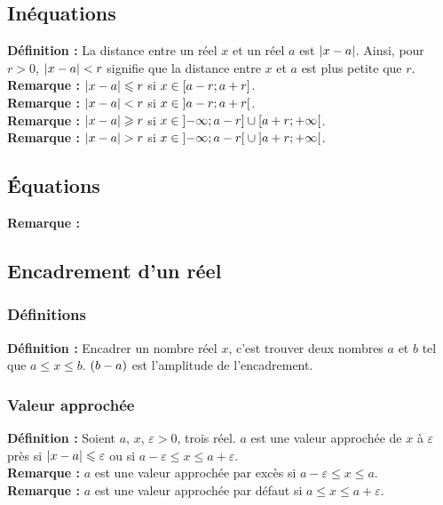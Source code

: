 \documentclass[a4paper,titlepage]{article}
\makeatletter
\let\oldleft\left
\renewcommand{\left}{\mathopen{}\mathclose\bgroup\oldleft}
\let\oldright\right
\renewcommand{\right}{\aftergroup\egroup\oldright}
\def\tikzscale{1}\begin{lrbox}{\measure@tikzpicture}
\edef\tikzscale{\pgfmathresult}
\makeatother
\begin{document}
    \subsection{Inéquations}
        \textbf{Définition :} La distance entre un réel $x$ et un réel $a$ est $\left|x-a\right|$. Ainsi, pour $r>0$, $\left|x-a\right|<r$ signifie que la distance entre $x$ et $a$ est plus petite que $r$.
        \\
        \textbf{Remarque :} $\left|x-a\right|\leqslant r$ si $x\in\left[a-r;a+r\right]$.
        \\
        \textbf{Remarque :} $\left|x-a\right|<r$ si $x\in\left]a-r;a+r\right[$.
        \\
        \textbf{Remarque :} $\left|x-a\right|\geqslant r$ si $x\in\left]-\infty;a-r\right]\cup\left[a+r;+\infty\right[$.
        \\
        \textbf{Remarque :} $\left|x-a\right|>r$ si $x\in\left]-\infty;a-r\right[\cup\left]a+r;+\infty\right[$.
    \subsection{Équations}
        \textbf{Remarque :}\\
        \begin{scaletikzpicturetowidth}{\textwidth}
        \end{scaletikzpicturetowidth}
    \subsection{Encadrement d’un réel} 
        \subsubsection{Définitions}
            \textbf{Définition :} Encadrer un nombre réel $x$, c’est trouver deux nombres $a$ et $b$ tel que $a\leqslant x\leqslant b$. $\left(b-a\right)$ est l’amplitude de l’encadrement.
        \subsubsection{Valeur approchée}
            \textbf{Définition :} Soient $a$, $x$, $\varepsilon>0$, trois réel. $a$ est une valeur approchée de $x$ à $\varepsilon$ près si $\left|x-a\right|\leqslant\varepsilon$ ou si $a-\varepsilon\leqslant x\leqslant a+\varepsilon$.
            \\
            \textbf{Remarque :} $a$ est une valeur approchée par excès si $a-\varepsilon\leqslant x\leqslant a$.
            \\
            \textbf{Remarque :} $a$ est une valeur approchée par défaut si $a\leqslant x\leqslant a+\varepsilon$.
\end{document}
